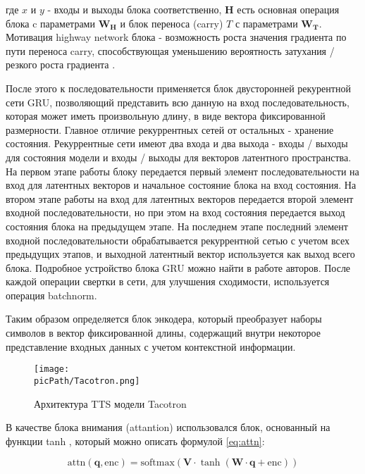 \documentclass[oneside,final,14pt]{extreport}
\newcommand{\picPath}{pictures}
\begin{document}
где $x$ и $y$ - входы и выходы блока соответственно, $\mathbf{H}$ есть основная операция блока c параметрами $\mathbf{W}_{\mathbf{H}}$ и блок переноса (carry) $T$ с параметрами $\mathbf{W}_{\mathbf{T}}$. Мотивация highway network блока - возможность роста значения градиента по пути переноса carry, способствующая уменьшению вероятность затухания / резкого роста градиента \cite{bib:highway_net}.  

После этого к последовательности применяется блок двусторонней рекурентной сети GRU\cite{bib:GRU},  позволяющий представить всю данную на вход последовательность, которая может иметь произвольную длину, в виде вектора фиксированной размерности. Главное отличие рекуррентных сетей от остальных - хранение состояния. Рекуррентные сети имеют два входа и два выхода - входы / выходы для состояния модели и входы / выходы для векторов латентного пространства. На первом этапе работы блоку передается первый элемент последовательности на вход для латентных векторов и начальное состояние блока на вход состояния. На втором этапе работы на вход для латентных векторов передается второй элемент входной последовательности, но при этом на вход состояния передается выход состояния блока на предыдущем этапе. На последнем этапе последний элемент входной последовательности обрабатывается рекуррентной сетью с учетом всех предыдущих этапов, и выходной латентный вектор используется как выход всего блока. Подробное устройство блока GRU можно найти в работе авторов\cite{bib:GRU}. После каждой операции свертки в сети, для улучшения сходимости, используется операция batchnorm\cite{bib:pytorch}.

Таким образом определяется блок энкодера, который преобразует наборы символов в вектор фиксированной длины, содержащий внутри некоторое представление входных данных с учетом контекстной информации. 

\begin{figure}[H]
\begin{center}
\texttt{[image: \\picPath/Tacotron.png]}
\end{center}
  \caption{Архитектура TTS модели Tacotron}
  \label{pic:Tacotron}
  \end{figure}
  
  В качестве блока внимания (attantion) использовался блок, основанный на функции tanh \cite{bib:attention}, который можно описать формулой \ref{eq:attn}: 
  
  $$
  \begin{equation}
 \text{attn}(\mathbf{q}, \text{enc}) = \text{softmax} (\mathbf{V}\cdot\tanh(\mathbf{W} \cdot \mathbf{q} + \text{enc} ))
 \label{eq:attn}
  \end{equation}
  $$
  
\end{document}

